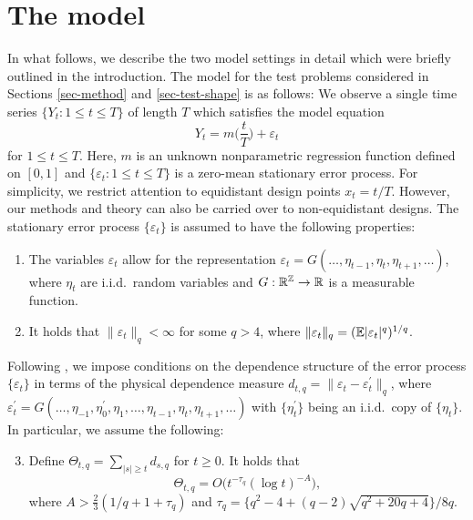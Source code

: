 
\section{The model}\label{sec-model}


In what follows, we describe the two model settings in detail which were briefly outlined in the introduction. The model for the test problems considered in Sections \ref{sec-method} and \ref{sec-test-shape} is as follows: We observe a single time series $\{Y_t: 1 \le t \le T \}$ of length $T$ which satisfies the model equation 
\begin{equation}\label{model1}
Y_t = m \Big( \frac{t}{T} \Big) + \varepsilon_t 
\end{equation}
for $1 \le t \le T$. Here, $m$ is an unknown nonparametric regression function defined on $[0,1]$ and $\{ \varepsilon_t: 1 \le t \le T \}$ is a zero-mean stationary error process. For simplicity, we restrict attention to equidistant design points $x_t = t/T$. However, our methods and theory can also be carried over to non-equidistant designs. The stationary error process $\{\varepsilon_t\}$ is assumed to have the following properties: 
\begin{enumerate}[label=(C\arabic*),leftmargin=1.05cm]

\item \label{C-err1} The variables $\varepsilon_t$ allow for the representation $\varepsilon_t = G(\ldots,\eta_{t-1},\eta_t,\eta_{t+1},\ldots)$, where $\eta_t$ are i.i.d.\ random variables and $G: \mathbb{R}^{\mathbb{Z}} \rightarrow \mathbb{R}$ is a measurable function. 

\item \label{C-err2} It holds that $\| \varepsilon_t \|_q < \infty$ for some $q > 4$, where $\| \varepsilon_t \|_q = (\mathbb{E}|\varepsilon_t|^q)^{1/q}$. 

\end{enumerate}
Following \cite{Wu2005}, we impose conditions on the dependence structure of the error process $\{\varepsilon_t\}$ in terms of the physical dependence measure $d_{t,q} = \| \varepsilon_t - \varepsilon_t^\prime \|_q$, where $\varepsilon_t^\prime = G(\ldots,\eta_{-1},\eta_0^\prime,\eta_1,\ldots,\eta_{t-1},\eta_t,\eta_{t+1},\ldots)$ with $\{\eta_t^\prime\}$ being an i.i.d.\ copy of $\{\eta_t\}$. In particular, we assume the following: 
\begin{enumerate}[label=(C\arabic*),leftmargin=1.05cm]
\setcounter{enumi}{2}

\item \label{C-err3} Define $\Theta_{t,q} = \sum\nolimits_{|s| \ge t} d_{s,q}$ for $t \ge 0$. It holds that 
\[ \Theta_{t,q} = O \big( t^{-\tau_q} (\log t)^{-A} \big), \]
where $A > \frac{2}{3} (1/q + 1 + \tau_q)$ and $\tau_q = \{q^2 - 4 + (q-2) \sqrt{q^2 + 20q + 4}\} / 8q$. 

\end{enumerate}
